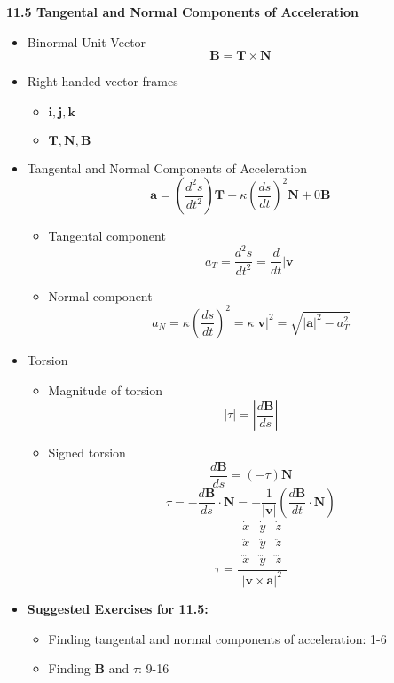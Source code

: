 \documentclass[12pt]{article}
\renewcommand{\vec}[1]{\mathbf{#1}}
\newcommand{\veci}{\mathbf{i}}
\newcommand{\vecj}{\mathbf{j}}
\newcommand{\veck}{\mathbf{k}}
\newcommand{\<}{\left<}
\renewcommand{\>}{\right>}
\begin{document}
  \newpage
  
  \centerline{\bf 11.5 Tangental and Normal Components of Acceleration}
  
    \begin{itemize}
    
      \item Binormal Unit Vector
        \[\vec{B} = \vec{T} \times \vec{N}\]

      \item Right-handed vector frames
        \begin{itemize}
          \item $\veci,\vecj,\veck$
          \item $\vec{T},\vec{N},\vec{B}$
        \end{itemize}
        
      \item Tangental and Normal Components of Acceleration
        \[\vec{a} = \left(\frac{d^2s}{dt^2}\right)\vec{T} + \kappa\left(\frac{ds}{dt}\right)^2\vec{N}+0\vec{B}\]
        \begin{itemize}
          \item Tangental component
            \[a_T = \frac{d^2s}{dt^2} = \frac{d}{dt}|\vec{v}| \]
          \item Normal component
            \[a_N = \kappa\left(\frac{ds}{dt}\right)^2 = \kappa|\vec{v}|^2 = \sqrt{|\vec{a}|^2 - a_T^2}\]
        \end{itemize}
      
      \item Torsion
        \begin{itemize}
          \item Magnitude of torsion
            \[|\tau| = \left|\frac{d\vec{B}}{ds}\right|\]
          \item Signed torsion
            \[\frac{d\vec{B}}{ds} = (-\tau)\vec{N}\]
            \[\tau = -\frac{d\vec{B}}{ds}\cdot \vec{N} = -\frac{1}{|\vec{v}|}\left(\frac{d\vec{B}}{dt}\cdot\vec{N}\right)\]
            \[
              \tau
              =
              \frac{
              \begin{array}{|ccc|}
              \dot{x} & \dot{y} & \dot{z} \\
              \ddot{x} & \ddot{y} & \ddot{z} \\
              \dddot{x} & \dddot{y} & \dddot{z}
              \end{array}
              }{
              |\vec{v}\times\vec{a}|^2
              }
            \]
        \end{itemize}
        
      \item \textbf{ Suggested Exercises for 11.5:}
      
        \begin{itemize}
        \item Finding tangental and normal components of acceleration: 1-6
        \item Finding $\vec{B}$ and $\tau$: 9-16
        \end{itemize}
    
    \end{itemize}
  
\end{document}
